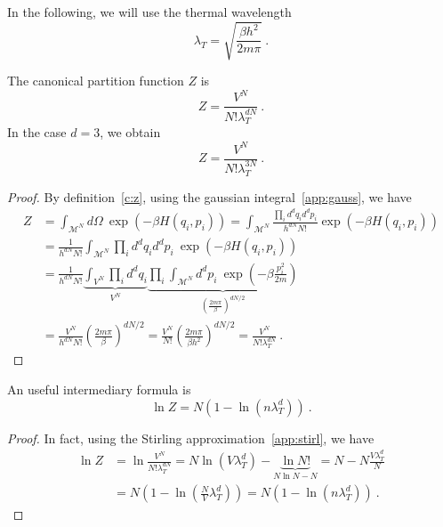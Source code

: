     In the following, we will use the thermal wavelength 
    \begin{equation*}
        \lambda_T = \sqrt{\frac{\beta h^2}{2 m \pi}} ~.
    \end{equation*}

    The canonical partition function $Z$ is 
    \begin{equation}\label{idcan}
        Z = \frac{V^N}{N! \lambda^{dN}_T} ~.
    \end{equation}
    In the case $d = 3$, we obtain 
    \begin{equation*}
        Z = \frac{V^N}{N! \lambda^{3N}_T} ~.
    \end{equation*}
    \begin{proof}
        By definition~\eqref{c:z}, using the gaussian integral~\eqref{app:gauss}, we have
        \begin{equation*}
        \begin{aligned}
            Z & = \int_{\mathcal M^N} d\Omega ~ \exp(- \beta H (q_i, p_i)) = \int_{\mathcal M^N} \frac{\prod_i d^d q_i d^d p_i}{h^{dN} N!} \exp(- \beta H (q_i, p_i)) \\ & = \frac{1}{h^{dN} N!} \int_{\mathcal M^N} \prod_i d^d q_i d^d p_i ~ \exp(- \beta H (q_i, p_i)) \\ & = \frac{1}{h^{dN} N!} \underbrace{\int_{ V^N} \prod_i d^d q_i}_{V^N} \underbrace{\prod_i \int_{\mathcal M^N} d^d p_i ~ \exp(- \beta \frac{p^2_i}{2m})}_{(\frac{2 m \pi}{\beta})^{dN/2}} \\ & = \frac{V^N}{h^{dN} N!} (\frac{2 m \pi}{\beta})^{dN/2} = \frac{V^N}{ N!} (\frac{2 m \pi}{\beta h^2})^{dN/2} = \frac{V^N}{N! \lambda^{dN}_T} ~.
        \end{aligned}
        \end{equation*}
    \end{proof}
    An useful intermediary formula is 
    \begin{equation*}
        \ln Z = N (1 - \ln (n \lambda_T^d)) ~.
    \end{equation*}
    \begin{proof}
        In fact, using the Stirling approximation~\eqref{app:stirl}, we have
        \begin{equation*}
        \begin{aligned}
            \ln Z & = \ln \frac{V^N}{N! \lambda^{dN}_T}= N \ln (V \lambda_T^d) - \underbrace{\ln N!}_{N \ln N - N} = N - N \frac{V \lambda_T^d}{N} \\ & = N (1 - \ln (\frac{N}{V} \lambda_T^d)) = N (1 - \ln (n \lambda_T^d))  ~.
        \end{aligned}
        \end{equation*}
    \end{proof}
